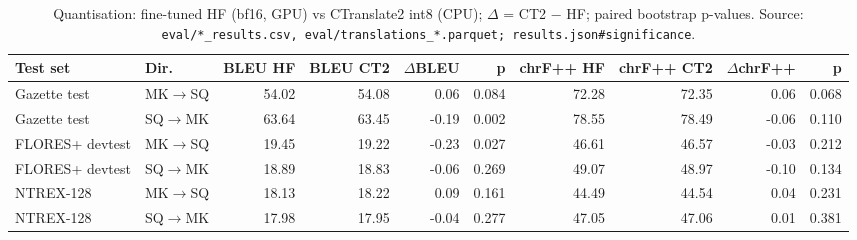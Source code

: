 \begin{table}[t]
\centering
\small
\begin{tabular}{llrrrrrrrr}
\toprule
Test set & Dir. & BLEU HF & BLEU CT2 & $\Delta$BLEU & p & chrF++ HF & chrF++ CT2 & $\Delta$chrF++ & p \\
\midrule
Gazette test & MK$\rightarrow$SQ & 54.02 & 54.08 & 0.06 & 0.084 & 72.28 & 72.35 & 0.06 & 0.068 \\
Gazette test & SQ$\rightarrow$MK & 63.64 & 63.45 & -0.19 & 0.002 & 78.55 & 78.49 & -0.06 & 0.110 \\
FLORES+ devtest & MK$\rightarrow$SQ & 19.45 & 19.22 & -0.23 & 0.027 & 46.61 & 46.57 & -0.03 & 0.212 \\
FLORES+ devtest & SQ$\rightarrow$MK & 18.89 & 18.83 & -0.06 & 0.269 & 49.07 & 48.97 & -0.10 & 0.134 \\
NTREX-128 & MK$\rightarrow$SQ & 18.13 & 18.22 & 0.09 & 0.161 & 44.49 & 44.54 & 0.04 & 0.231 \\
NTREX-128 & SQ$\rightarrow$MK & 17.98 & 17.95 & -0.04 & 0.277 & 47.05 & 47.06 & 0.01 & 0.381 \\
\bottomrule
\end{tabular}
\caption{Quantisation: fine-tuned HF (bf16, GPU) vs CTranslate2 int8 (CPU); $\Delta$ = CT2 − HF; paired bootstrap p-values. Source: \texttt{eval/*\_results.csv, eval/translations\_*.parquet; results.json\#significance}.}
\label{tab:e01-quantisation}
\end{table}
